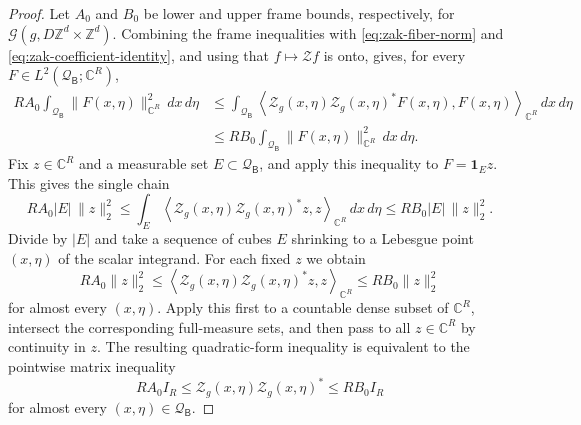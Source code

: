 \documentclass[11pt,reqno]{amsart}
\numberwithin{equation}{section}
\theoremstyle{definition}
\theoremstyle{remark}
\newcommand{\Z}{\mathbb Z}
\newcommand{\C}{\mathbb C}
\newcommand{\G}{\mathcal G}
\begin{document}
\begin{proof}
Let $A_0$ and $B_0$ be lower and upper frame bounds, respectively, for
$\G(g,D\Z^d\times\Z^d)$.  Combining the frame inequalities with
\eqref{eq:zak-fiber-norm} and \eqref{eq:zak-coefficient-identity}, and using
that $f\mapsto\mathcal Zf$ is onto, gives, for every
$F\in L^2(\mathcal Q_{\mathsf B};\C^R)$,
\[
 \begin{aligned}
 R A_0\int_{\mathcal Q_{\mathsf B}}\!\|F(x,\eta)\|_{\C^R}^2\,dx\,d\eta
 &\le
 \int_{\mathcal Q_{\mathsf B}}
 \left\langle
   \mathcal Z_g(x,\eta)\mathcal Z_g(x,\eta)^*F(x,\eta),F(x,\eta)
 \right\rangle_{\C^R}\,dx\,d\eta\\
 &\le
 R B_0\int_{\mathcal Q_{\mathsf B}}\!\|F(x,\eta)\|_{\C^R}^2\,dx\,d\eta.
 \end{aligned}
\]
Fix $z\in\C^R$ and a measurable set
$E\subset\mathcal Q_{\mathsf B}$, and apply this inequality to
$F=\mathbf 1_Ez$.  This gives the
single chain
\[
 R A_0|E|\,\|z\|_2^2
 \le
 \int_E\left\langle
   \mathcal Z_g(x,\eta)\mathcal Z_g(x,\eta)^*z,z
 \right\rangle_{\C^R}\,dx\,d\eta
 \le
 R B_0|E|\,\|z\|_2^2.
\]
Divide by $|E|$ and take a sequence of cubes $E$ shrinking to a
Lebesgue point $(x,\eta)$ of the scalar integrand.  For each fixed $z$ we obtain
\[
 R A_0\|z\|_2^2
 \le
 \left\langle
   \mathcal Z_g(x,\eta)\mathcal Z_g(x,\eta)^*z,z
 \right\rangle_{\C^R}
 \le
 R B_0\|z\|_2^2
\]
for almost every $(x,\eta)$.  Apply this first to a countable dense subset
of $\C^R$, intersect the corresponding full-measure sets, and then pass to
all $z\in\C^R$ by continuity in $z$.  The resulting quadratic-form
inequality is equivalent to the pointwise matrix inequality
\begin{equation}\label{eq:zak-matrix-frame-bounds}
 R A_0 I_R
 \le \mathcal Z_g(x,\eta)\mathcal Z_g(x,\eta)^*
 \le R B_0 I_R
\end{equation}
for almost every $(x,\eta)\in\mathcal Q_{\mathsf B}$.


\end{proof}
\end{document}
